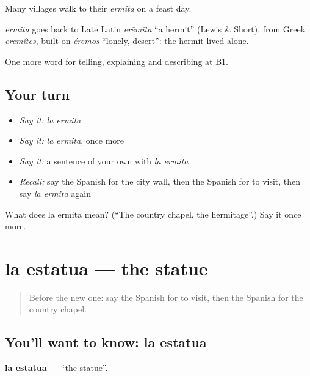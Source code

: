Many villages walk to their \emph{ermita} on a feast day.

\begin{cousinweb}
\emph{ermita} goes back to Late Latin \emph{erēmīta} \textquotedblleft{}a hermit\textquotedblright{} (Lewis \& Short), from Greek \emph{erēmítēs}, built on \emph{érēmos} \textquotedblleft{}lonely, desert\textquotedblright{}: the hermit lived alone.
\end{cousinweb}

\begin{grammarlens}[title={What you've built}]
One more word for telling, explaining and describing at B1.
\end{grammarlens}

\subsection*{Your turn}
\begin{itemize}
\raggedright
  \item \emph{Say it:} \emph{la ermita}
  \item \emph{Say it:} \emph{la ermita}, once more
  \item \emph{Say it:} a sentence of your own with \emph{la ermita}
  \item \emph{Recall:} say the Spanish for the city wall, then the Spanish for to visit, then say \emph{la ermita} again
\end{itemize}

\begin{tcolorbox}[breakable,colback=teal!4,colframe=teal!35!black,title={Before you move on}]
What does la ermita mean? (\textquotedblleft{}The country chapel, the hermitage\textquotedblright{}.) Say it once more.
\end{tcolorbox}
\section[la estatua]{la estatua — the statue}

\label{lesson:ES-C678-estatua}



\begin{quote}
Before the new one: say the Spanish for to visit, then the Spanish for the country chapel.
\end{quote}

\subsection*{You'll want to know: la estatua}
\textbf{la estatua} — \textquotedblleft{}the statue\textquotedblright{}.

